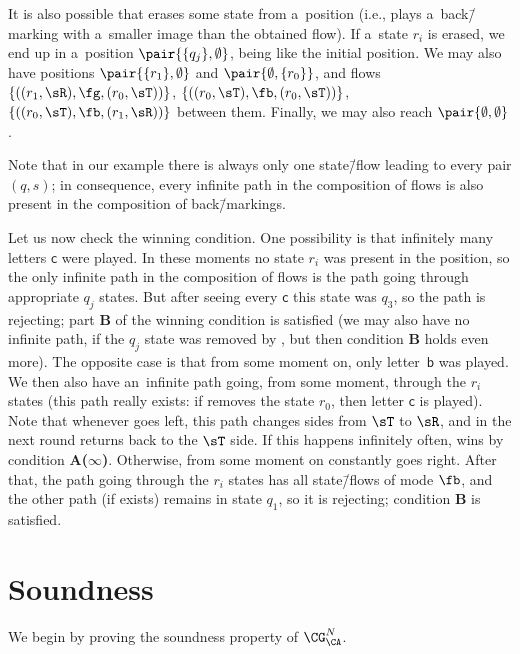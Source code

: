 \documentclass{lmcs}
\numberwithin{equation}{section}
\numberwithin{figure}{section}
\newcommand{\itemfont}[1]{\textbf{#1}}
\begin{document}
\begin{exa}
	It is also possible that \adam erases some state from a~position (i.e., plays a~back\=/marking with a~smaller image than the obtained flow).
	If a~state $r_i$ is erased, we end up in a~position $\pair{\{q_j\},\emptyset}$, being like the initial position.
	We may also have positions $\pair{\{r_1\},\emptyset}$ and $\pair{\emptyset,\{r_0\}}$,
	and flows $\{((r_1,\sR),\fg,(r_0,\sT))\}$, $\{((r_0,\sT),\fb,(r_0,\sT))\}$, $\{((r_0,\sT),\fb,(r_1,\sR))\}$ between them.
	Finally, we may also reach $\pair{\emptyset,\emptyset}$.
	
	Note that in our example there is always only one state\=/flow leading to every pair $(q,s)$;
	in consequence, every infinite path in the composition of flows is also present in the composition of back\=/markings.
	
	Let us now check the winning condition.
	One possibility is that infinitely many letters $\mathsf{c}$ were played.
	In these moments no state $r_i$ was present in the position, so the only infinite path in the composition of flows is the path going through appropriate $q_j$ states.
	But after seeing every $\mathsf{c}$ this state was $q_3$, so the path is rejecting; part \itemfont{B} of the winning condition is satisfied
	(we may also have no infinite path, if the $q_j$ state was removed by \adam, but then condition \itemfont{B} holds even more).
	The opposite case is that from some moment on, only letter~$\mathsf{b}$ was played.
	We then also have an~infinite path going, from some moment, through the $r_i$ states (this path really exists: if \adam removes the state $r_0$, then letter $\mathsf{c}$ is played).
	Note that whenever \adam goes left, this path changes sides from $\sT$ to $\sR$, and in the next round returns back to the $\sT$ side.
	If this happens infinitely often, \eve wins by condition \itemfont{A($\infty$)}.
	Otherwise, from some moment on \adam constantly goes right.
	After that, the path going through the $r_i$ states has all state\=/flows of mode $\fb$,
	and the other path (if exists) remains in state $q_1$, so it is rejecting;
	condition \itemfont{B} is satisfied.
\end{exa}



\section{Soundness}
\label{sec:soundness}

We begin by proving the soundness property of $\CG^N_\CA$.
\end{document}
